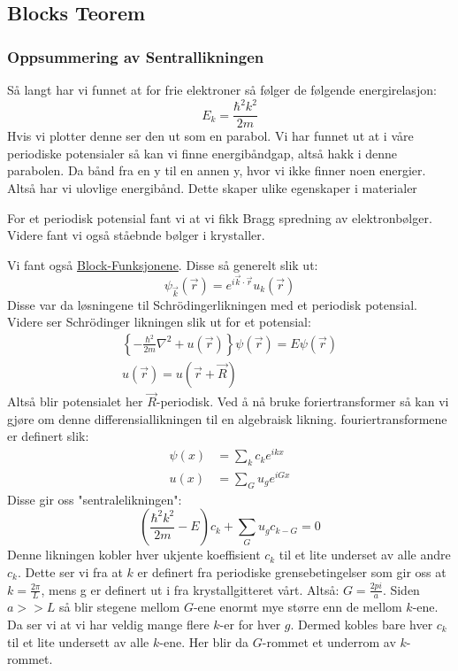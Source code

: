 \documentclass{article}
\begin{document}
\subsection{Blocks Teorem}
\subsubsection{Oppsummering av Sentrallikningen}
Så langt har vi funnet at for frie elektroner så følger de følgende energirelasjon:
\begin{equation}
  \label{eq:energi_for_frie_elektroner}
  E_k = \frac{\hbar^2 k^2}{2m}
\end{equation}
Hvis vi plotter denne ser den ut som en parabol. Vi har funnet ut at i våre periodiske potensialer så kan vi finne energibåndgap, altså hakk i denne parabolen. Da bånd fra en y til en annen y, hvor vi ikke finner noen energier. Altså har vi ulovlige energibånd. Dette skaper ulike egenskaper i materialer %

For et periodisk potensial fant vi at vi fikk Bragg spredning av elektronbølger. Videre fant vi også ståebnde bølger i krystaller.

Vi fant også \underline{Block-Funksjonene}. Disse så generelt slik ut:
\begin{equation}
  \label{eq:block_funksjoner}
  \psi_{\vec{k}}(\vec{r}) = e^{i\vec{k}\cdot\vec{r}}u_k(\vec{r})
\end{equation}
Disse var da løsningene til Schrödingerlikningen med et periodisk potensial.
Videre ser Schrödinger likningen slik ut for et potensial:
\begin{align}
  \label{eq:schrödinger_likningen_med_periodisk_potensial}
  \left\{  -\frac{\hbar^2}{2m}\nabla^2 + u(\vec{r})  \right\}\psi(\vec{r}) = E\psi(\vec{r}) \\
  u(\vec{r}) = u(\vec{r} + \vec{R})
\end{align}
Altså blir potensialet her $\vec{R}$-periodisk. Ved å nå bruke foriertransformer så kan vi gjøre om denne differensiallikningen til en algebraisk likning. fouriertransformene er definert slik:
\begin{align*}
  \psi(x) &= \sum_k c_k e^{ikx} \\
  u(x) &= \sum_G u_g e^{iGx}
\end{align*}
Disse gir oss "sentralelikningen":
\begin{equation}
  \label{eq:den_sentrale_likningen}
  \left(\frac{\hbar^2 k^2}{2m} - E\right)c_k + \sum_G u_g c_{k-G} = 0
\end{equation}
Denne likningen kobler hver ukjente koeffisient $c_k$ til et lite underset av alle andre $c_k$. Dette ser vi fra at $k$ er definert fra periodiske grensebetingelser som gir oss at $k = \frac{2\pi}{L}$, mens g er definert ut i fra krystallgitteret vårt. Altså: $G = \frac{2pi}{a}$. Siden $a >> L$ så blir stegene mellom $G$-ene enormt mye større enn de mellom $k$-ene. Da ser vi at vi har veldig mange flere $k$-er for hver $g$. Dermed kobles bare hver $c_k$ til et lite undersett av alle $k$-ene. Her blir da $G$-rommet et underrom av $k$-rommet.
\end{document}
